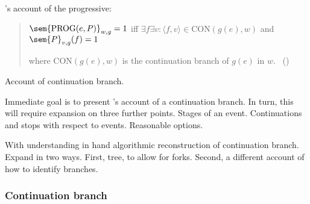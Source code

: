 \begin{note}
  \citeauthor{Landman:1992wh}'s account of the progressive:

  \begin{quote}
    \(\sem{\text{PROG}(e, P)}_{w,g} = 1\) iff \(\exists f \exists v\colon \langle f,v \rangle \in \text{CON}(g(e), w)\)\newline
    \phantom{an} and \(\sem{P}_{v,g}(f) = 1\)\par

    where \(\text{CON}(g(e), w)\) is the continuation branch of \(g(e)\) in \(w\).\newline
    \mbox{ }\hfill\mbox{(\citeyear[27]{Landman:1992wh})}
  \end{quote}
  Account of continuation branch.
\end{note}


\begin{note}
  Immediate goal is to present \citeauthor{Landman:1992wh}'s account of a continuation branch.
  In turn, this will require expansion on three further points.
  Stages of an event.
  Continuations and stops with respect to events.
  Reasonable options.

  With understanding in hand algorithmic reconstruction of continuation branch.
  Expand in two ways.
  First, tree, to allow for forks.
  Second, a different account of how to identify branches.
\end{note}

\subsubsection{Continuation branch}

